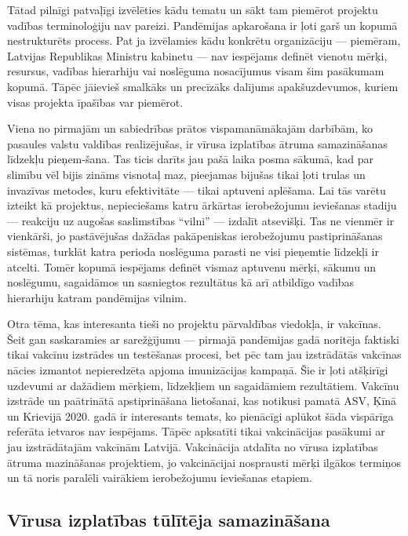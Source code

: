\documentclass[12pt, a4paper]{article}
\numberwithin{equation}{section} %
\begin{document}
Tātad pilnīgi patvaļīgi izvēlēties kādu tematu un sākt tam piemērot projektu vadības terminoloģiju nav pareizi. Pandēmijas apkarošana ir ļoti garš un kopumā nestrukturēts process. Pat ja izvēlamies kādu konkrētu organizāciju --- piemēram, Latvijas Republikas Ministru kabinetu --- nav iespējams definēt vienotu mērķi, resursus, vadības hierarhiju vai noslēguma nosacījumus visam šim pasākumam kopumā. Tāpēc jāievieš smalkāks un precīzāks dalījums apakšuzdevumos, kuriem visas projekta īpašības var piemērot.

Viena no pirmajām un sabiedrības prātos vispamanāmākajām darbībām, ko pasaules valstu valdības realizējušas, ir vīrusa izplatības ātruma samazināšanas līdzekļu pieņem-šana. Tas ticis darīts jau pašā laika posma sākumā, kad par slimību vēl bijis zināms visnotaļ maz, pieejamas bijušas tikai ļoti trulas un invazīvas metodes, kuru efektivitāte --- tikai aptuveni aplēšama. Lai tās varētu izteikt kā projektus, nepieciešams katru ārkārtas ierobežojumu ieviešanas stadiju --- reakciju uz augošas saslimstības ``vilni'' --- izdalīt atsevišķi. Tas ne vienmēr ir vienkārši, jo pastāvējušas dažādas pakāpeniskas ierobežojumu pastiprināšanas sistēmas, turklāt katra perioda noslēguma parasti ne visi pieņemtie līdzekļi ir atcelti. Tomēr kopumā iespējams definēt vismaz aptuvenu mērķi, sākumu un noslēgumu, sagaidāmos un sasniegtos rezultātus kā arī atbildīgo vadības hierarhiju katram pandēmijas vilnim.

Otra tēma, kas interesanta tieši no projektu pārvaldības viedokļa, ir vakcīnas. Šeit gan saskaramies ar sarežģījumu --- pirmajā pandēmijas gadā noritēja faktiski tikai vakcīnu izstrādes un testēšanas procesi, bet pēc tam jau izstrādātās vakcīnas nācies izmantot nepieredzēta apjoma imunizācijas kampaņā. Šie ir ļoti atšķirīgi uzdevumi ar dažādiem mērķiem, līdzekļiem un sagaidāmiem rezultātiem. Vakcīnu izstrāde un paātrinātā apstiprināšana lietošanai, kas notikusi pamatā ASV, Ķīnā un Krievijā 2020. gadā ir interesants temats, ko pienācīgi aplūkot šāda vispārīga referāta ietvaros nav iespējams. Tāpēc apksatīti tikai vakcinācijas pasākumi ar jau izstrādātajām vakcīnām Latvijā. Vakcinācija atdalīta no vīrusa izplatības ātruma mazināšanas projektiem, jo vakcinācijai nosprausti mērķi ilgākos termiņos un tā noris paralēli vairākiem ierobežojumu ieviešanas etapiem.

\subsection{Vīrusa izplatības tūlītēja samazināšana}
\end{document}
